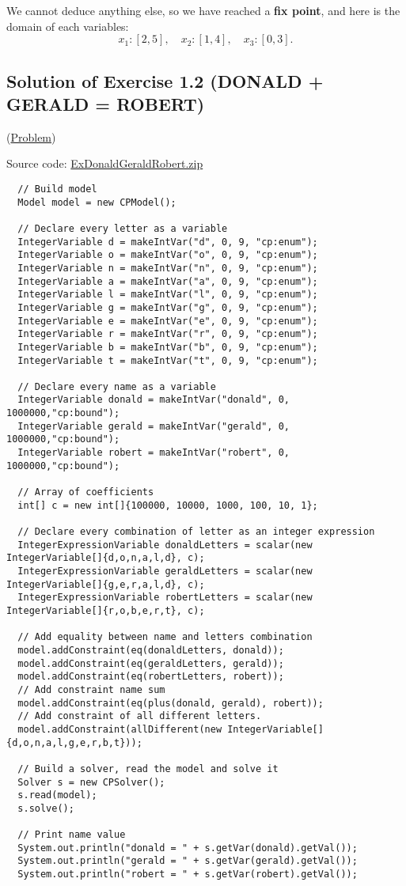 We cannot deduce anything else, so we have reached a \textbf{fix point}, and here is the domain of each variables:
$$x_{1} : [2,5],\quad x_{2} : [1,4],\quad x_{3} : [0,3].$$


\subsection{Solution of Exercise 1.2 (DONALD + GERALD = ROBERT)}\label{solutions:solutionofexercise1.2}\hypertarget{solutions:solutionofexercise1.2}{}

(\hyperlink{exercises:exercise1.2}{Problem})

Source code: \href{media/zip/exdonaldgeraldrobert.zip}{ExDonaldGeraldRobert.zip}

\begin{lstlisting}
  // Build model
  Model model = new CPModel();
  
  // Declare every letter as a variable
  IntegerVariable d = makeIntVar("d", 0, 9, "cp:enum");
  IntegerVariable o = makeIntVar("o", 0, 9, "cp:enum");
  IntegerVariable n = makeIntVar("n", 0, 9, "cp:enum");
  IntegerVariable a = makeIntVar("a", 0, 9, "cp:enum");
  IntegerVariable l = makeIntVar("l", 0, 9, "cp:enum");
  IntegerVariable g = makeIntVar("g", 0, 9, "cp:enum");
  IntegerVariable e = makeIntVar("e", 0, 9, "cp:enum");
  IntegerVariable r = makeIntVar("r", 0, 9, "cp:enum");
  IntegerVariable b = makeIntVar("b", 0, 9, "cp:enum");
  IntegerVariable t = makeIntVar("t", 0, 9, "cp:enum");
  
  // Declare every name as a variable  
  IntegerVariable donald = makeIntVar("donald", 0, 1000000,"cp:bound");
  IntegerVariable gerald = makeIntVar("gerald", 0, 1000000,"cp:bound");
  IntegerVariable robert = makeIntVar("robert", 0, 1000000,"cp:bound");
  
  // Array of coefficients
  int[] c = new int[]{100000, 10000, 1000, 100, 10, 1}; 
  
  // Declare every combination of letter as an integer expression
  IntegerExpressionVariable donaldLetters = scalar(new IntegerVariable[]{d,o,n,a,l,d}, c);
  IntegerExpressionVariable geraldLetters = scalar(new IntegerVariable[]{g,e,r,a,l,d}, c);
  IntegerExpressionVariable robertLetters = scalar(new IntegerVariable[]{r,o,b,e,r,t}, c);
  
  // Add equality between name and letters combination
  model.addConstraint(eq(donaldLetters, donald));
  model.addConstraint(eq(geraldLetters, gerald));
  model.addConstraint(eq(robertLetters, robert));
  // Add constraint name sum
  model.addConstraint(eq(plus(donald, gerald), robert));
  // Add constraint of all different letters.
  model.addConstraint(allDifferent(new IntegerVariable[]{d,o,n,a,l,g,e,r,b,t}));
  
  // Build a solver, read the model and solve it
  Solver s = new CPSolver();
  s.read(model);
  s.solve();
  
  // Print name value
  System.out.println("donald = " + s.getVar(donald).getVal());
  System.out.println("gerald = " + s.getVar(gerald).getVal());
  System.out.println("robert = " + s.getVar(robert).getVal());
\end{lstlisting}


